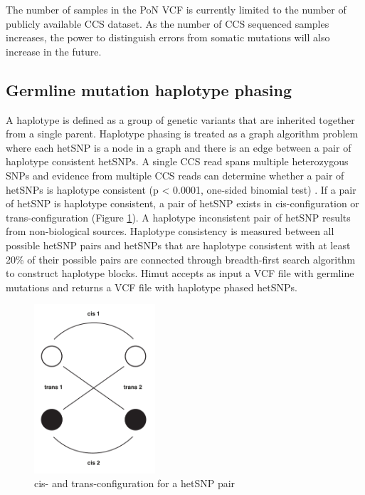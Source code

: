 The number of samples in the PoN VCF is currently limited to the number of publicly available CCS dataset. As the number of CCS sequenced samples increases, the power to distinguish errors from somatic mutations will also increase in the future.  

\subsection{Germline mutation haplotype phasing}

A haplotype is defined as a group of genetic variants that are inherited together from a single parent. Haplotype phasing is treated as a graph algorithm problem where each hetSNP is a node in a graph and there is an edge between a pair of haplotype consistent hetSNPs. A single CCS read spans multiple heterozygous SNPs and evidence from multiple CCS reads can determine whether a pair of hetSNPs is haplotype consistent (p < 0.0001, one-sided binomial test) . If a pair of hetSNP is haplotype consistent, a pair of hetSNP exists in cis-configuration or trans-configuration (Figure \ref{figure:cis-trans-configuration}). A haplotype inconsistent pair of hetSNP results from non-biological sources. Haplotype consistency is measured between all possible hetSNP pairs and hetSNPs that are haplotype consistent with at least 20\% of their possible pairs are connected through breadth-first search algorithm to construct haplotype blocks. Himut accepts as input a VCF file with germline mutations and returns a VCF file with haplotype phased hetSNPs.

\begin{figure}[htbp!]
\caption{cis- and trans-configuration for a hetSNP pair}
\label{figure:cis-trans-configuration}
\includegraphics[width=0.4\textwidth]{Vector/cis_trans_configuration.pdf}
\end{figure}

